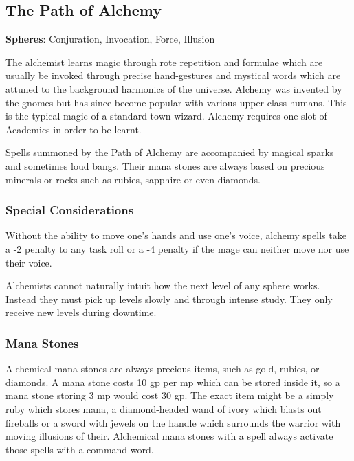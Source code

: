\begin{multicols}{2}

\subsection{The Path of Alchemy}

\noindent\textbf{Spheres}: Conjuration, Invocation, Force, Illusion

\noindent The alchemist learns magic through rote repetition and formulae which are usually be invoked through precise hand-gestures and mystical words which are attuned to the background harmonics of the universe.  Alchemy was invented by the gnomes but has since become popular with various upper-class humans. This is the typical magic of a standard town wizard. Alchemy requires one slot of Academics in order to be learnt.

Spells summoned by the Path of Alchemy are accompanied by magical sparks and sometimes loud bangs. Their mana stones are always based on precious minerals or rocks such as rubies, sapphire or even diamonds. 

\subsubsection{Special Considerations}

Without the ability to move one's hands and use one's voice, alchemy spells take a -2 penalty to any task roll or a -4 penalty if the mage can neither move nor use their voice.

Alchemists cannot naturally intuit how the next level of any sphere works.
Instead they must pick up levels slowly and through intense study.
They only receive new levels during \gls{downtime}.

\subsubsection{Mana Stones}

Alchemical mana stones are always precious items, such as gold, rubies, or diamonds.  A mana stone costs 10 gp per \gls{mp} which can be stored inside it, so a mana stone storing 3 \gls{mp} would cost 30 gp. The exact item might be a simply ruby which stores mana, a diamond-headed wand of ivory which blasts out fireballs or a sword with jewels on the handle which surrounds the warrior with moving illusions of their. Alchemical mana stones with a spell always activate those spells with a command word.


\end{multicols}
